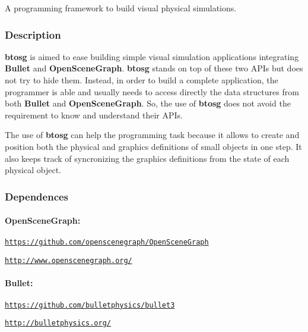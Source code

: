 A programming framework to build visual physical simulations.

\subsubsection*{Description}

{\bfseries btosg} is aimed to ease building simple visual simulation applications integrating {\bfseries Bullet} and {\bfseries Open\+Scene\+Graph}. {\bfseries btosg} stands on top of these two A\+P\+Is but does not try to hide them. Instead, in order to build a complete application, the programmer is able and usually needs to access directly the data structures from both {\bfseries Bullet} and {\bfseries Open\+Scene\+Graph}. So, the use of {\bfseries btosg} does not avoid the requirement to know and understand their A\+P\+Is.

The use of {\bfseries btosg} can help the programming task because it allows to create and position both the physical and graphics definitions of small objects in one step. It also keeps track of syncronizing the graphics definitions from the state of each physical object.

\subsubsection*{Dependences}

\paragraph*{Open\+Scene\+Graph\+:}


\begin{DoxyItemize}
\item \href{https://github.com/openscenegraph/OpenSceneGraph}{\tt https\+://github.\+com/openscenegraph/\+Open\+Scene\+Graph}
\item \href{http://www.openscenegraph.org/}{\tt http\+://www.\+openscenegraph.\+org/}
\end{DoxyItemize}

\paragraph*{Bullet\+:}


\begin{DoxyItemize}
\item \href{https://github.com/bulletphysics/bullet3}{\tt https\+://github.\+com/bulletphysics/bullet3}
\item \href{http://bulletphysics.org/}{\tt http\+://bulletphysics.\+org/}
\end{DoxyItemize}

